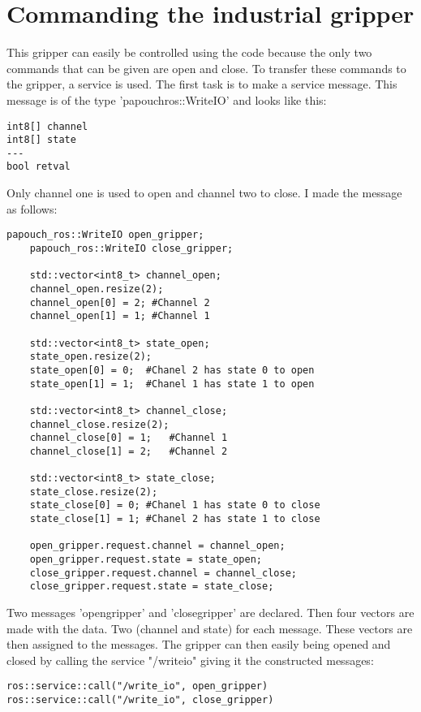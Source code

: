 \documentclass[11pt,a4paper]{report}
\begin{document}
\section{Commanding the industrial gripper}\label{CommandingGripper}
This gripper can easily be controlled using the code because the only two commands that can be given are open and close. To transfer these commands to the gripper, a service is used. The first task is to make a service message. This message is of the type 'papouch\textunderscore ros::WriteIO' and looks like this:
\begin{verbatim}
int8[] channel
int8[] state
---
bool retval
\end{verbatim}
Only channel one is used to open and channel two to close. I made the message as follows:
\begin{verbatim}
papouch_ros::WriteIO open_gripper;
	papouch_ros::WriteIO close_gripper;

	std::vector<int8_t> channel_open;
	channel_open.resize(2);
	channel_open[0] = 2; #Channel 2
	channel_open[1] = 1; #Channel 1

	std::vector<int8_t> state_open;
	state_open.resize(2);
	state_open[0] = 0;	#Chanel 2 has state 0 to open
	state_open[1] = 1;	#Chanel 1 has state 1 to open

	std::vector<int8_t> channel_close;
	channel_close.resize(2);
	channel_close[0] = 1;	#Channel 1
	channel_close[1] = 2;	#Channel 2

	std::vector<int8_t> state_close;
	state_close.resize(2);
	state_close[0] = 0;	#Chanel 1 has state 0 to close
	state_close[1] = 1;	#Chanel 2 has state 1 to close

	open_gripper.request.channel = channel_open;
	open_gripper.request.state = state_open;
	close_gripper.request.channel = channel_close;
	close_gripper.request.state = state_close;
\end{verbatim}
Two messages 'open\textunderscore gripper' and 'close\textunderscore gripper' are declared. Then four vectors are made with the data. Two (channel and state) for each message. These vectors are then assigned to the messages. The gripper can then easily being opened and closed by calling the service "/write\textunderscore io" giving it the constructed messages:
\begin{verbatim}
ros::service::call("/write_io", open_gripper)
ros::service::call("/write_io", close_gripper)
\end{verbatim}
\end{document}
